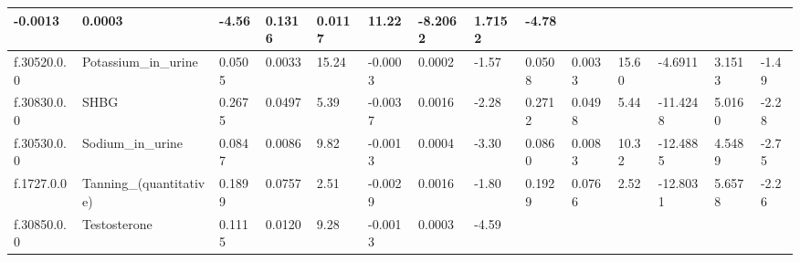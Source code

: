 \begin{longtable}{llllllllllllll}
  \multicolumn{1}{l|}{-0.0013} &
  \multicolumn{1}{l|}{0.0003} &
  \multicolumn{1}{l|}{-4.56} &
  \multicolumn{1}{l|}{0.1316} &
  \multicolumn{1}{l|}{0.0117} &
  \multicolumn{1}{l|}{11.22} &
  \multicolumn{1}{l|}{-8.2062} &
  \multicolumn{1}{l|}{1.7152} &
  \multicolumn{1}{l|}{-4.78} \\ \hline
\multicolumn{1}{|l|}{f.30520.0.0} &
  \multicolumn{1}{l|}{Potassium\_in\_urine} &
  \multicolumn{1}{l|}{0.0505} &
  \multicolumn{1}{l|}{0.0033} &
  \multicolumn{1}{l|}{15.24} &
  \multicolumn{1}{l|}{-0.0003} &
  \multicolumn{1}{l|}{0.0002} &
  \multicolumn{1}{l|}{-1.57} &
  \multicolumn{1}{l|}{0.0508} &
  \multicolumn{1}{l|}{0.0033} &
  \multicolumn{1}{l|}{15.60} &
  \multicolumn{1}{l|}{-4.6911} &
  \multicolumn{1}{l|}{3.1513} &
  \multicolumn{1}{l|}{-1.49} \\ \hline
\multicolumn{1}{|l|}{f.30830.0.0} &
  \multicolumn{1}{l|}{SHBG} &
  \multicolumn{1}{l|}{0.2675} &
  \multicolumn{1}{l|}{0.0497} &
  \multicolumn{1}{l|}{5.39} &
  \multicolumn{1}{l|}{-0.0037} &
  \multicolumn{1}{l|}{0.0016} &
  \multicolumn{1}{l|}{-2.28} &
  \multicolumn{1}{l|}{0.2712} &
  \multicolumn{1}{l|}{0.0498} &
  \multicolumn{1}{l|}{5.44} &
  \multicolumn{1}{l|}{-11.4248} &
  \multicolumn{1}{l|}{5.0160} &
  \multicolumn{1}{l|}{-2.28} \\ \hline
\multicolumn{1}{|l|}{f.30530.0.0} &
  \multicolumn{1}{l|}{Sodium\_in\_urine} &
  \multicolumn{1}{l|}{0.0847} &
  \multicolumn{1}{l|}{0.0086} &
  \multicolumn{1}{l|}{9.82} &
  \multicolumn{1}{l|}{-0.0013} &
  \multicolumn{1}{l|}{0.0004} &
  \multicolumn{1}{l|}{-3.30} &
  \multicolumn{1}{l|}{0.0860} &
  \multicolumn{1}{l|}{0.0083} &
  \multicolumn{1}{l|}{10.32} &
  \multicolumn{1}{l|}{-12.4885} &
  \multicolumn{1}{l|}{4.5489} &
  \multicolumn{1}{l|}{-2.75} \\ \hline
\multicolumn{1}{|l|}{f.1727.0.0} &
  \multicolumn{1}{l|}{Tanning\_(quantitative)} &
  \multicolumn{1}{l|}{0.1899} &
  \multicolumn{1}{l|}{0.0757} &
  \multicolumn{1}{l|}{2.51} &
  \multicolumn{1}{l|}{-0.0029} &
  \multicolumn{1}{l|}{0.0016} &
  \multicolumn{1}{l|}{-1.80} &
  \multicolumn{1}{l|}{0.1929} &
  \multicolumn{1}{l|}{0.0766} &
  \multicolumn{1}{l|}{2.52} &
  \multicolumn{1}{l|}{-12.8031} &
  \multicolumn{1}{l|}{5.6578} &
  \multicolumn{1}{l|}{-2.26} \\ \hline
\multicolumn{1}{|l|}{f.30850.0.0} &
  \multicolumn{1}{l|}{Testosterone} &
  \multicolumn{1}{l|}{0.1115} &
  \multicolumn{1}{l|}{0.0120} &
  \multicolumn{1}{l|}{9.28} &
  \multicolumn{1}{l|}{-0.0013} &
  \multicolumn{1}{l|}{0.0003} &
  \multicolumn{1}{l|}{-4.59} &

\end{longtable}
